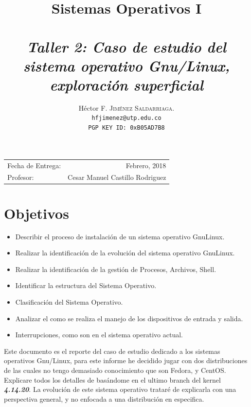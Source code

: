 \documentclass[paper=a4, fontsize=12pt]{article} 		%
\title{Sistemas Operativos I\\ 
\horrule{0.5pt} \\[0.4cm] 								%
\textit{Taller 2: Caso de estudio del sistema operativo Gnu/Linux, exploración superficial}
\horrule{1pt} \\[0.5cm] 			
}
\author{												
Héctor F. \textsc{Jiménez Saldarriaga.}\\				%
\texttt{hfjimenez@utp.edu.co} \\						
\texttt{PGP KEY ID: 0xB05AD7B8}
}
\date{}    						                       %
\numberwithin{equation}{section}						%
\numberwithin{table}{section} 							%
\begin{document}
\maketitle                      			           %
\begin{center}
\begin{tabular}{l r}								   %
Fecha de Entrega: & Febrero, 2018 \\				   %
Profesor: & Cesar Manuel Castillo Rodriguez
\end{tabular}
\end{center}
\section{Objetivos}
\begin{itemize}
	\item Describir el proceso de instalación de un sistema operativo  Gnu\/Linux. 
    \item Realizar la identificación de la evolución del sistema operativo Gnu\/Linux.
    \item Realizar la identificación de la gestión de Procesos, Archivos, Shell.
    \item Identificar la estructura del Sistema Operativo.
    \item Clasificación del Sistema Operativo.
    \item Analizar el como se realiza el manejo de los dispositivos de entrada y salida.
    \item Interrupciones, como son en el sistema operativo actual. 
\end{itemize}
Este documento es el reporte del caso de estudio dedicado a los sistemas operativos Gnu/Linux, para este informe he decidido jugar con dos distribuciones de las cuales no tengo demasiado conocimiento que son Fedora, y CentOS. Explicare todos los detalles de basándome en el ultimo branch del kernel \textbf{\textit{4.14.20}}. 
La evolución de este sistema operativo trataré de explicarla con una perspectiva general, y no enfocada a una distribución en especifica.
\end{document}
